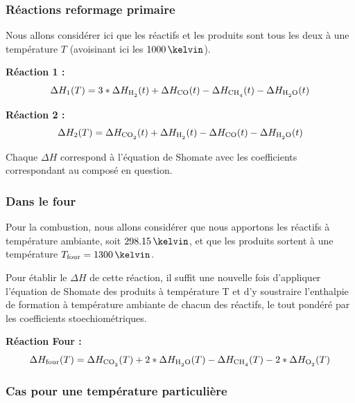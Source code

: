 \subsubsection{Réactions reformage primaire}

Nous allons considérer ici que les réactifs et les produits sont tous les deux
à une température $T$ (avoisinant ici les $1000\,\kelvin$).

\textbf{Réaction 1 :} 
\begin{equation*}
\Delta H_1 (T) = 3*\Delta H_{\ce{H2}} (t)
+ \Delta H_{\ce{CO}} (t)
- \Delta H_{\ce{CH4}} (t)
- \Delta H_{\ce{H2O}} (t)
\end{equation*}

\textbf{Réaction 2 :} 
\begin{equation*}
\Delta H_2 (T) = \Delta H_{\ce{CO2}} (t)
+ \Delta H_{\ce{H2}} (t)
- \Delta H_{\ce{CO}} (t)
- \Delta H_{\ce{H2O}} (t)
\end{equation*}

Chaque $\Delta H$ correspond à l’équation de Shomate
avec les coefficients correspondant au composé en question.

\subsubsection{Dans le four}

Pour la combustion, nous allons considérer que nous apportons les réactifs
à température ambiante, soit $298.15\,\kelvin$,
et que les produits sortent à une température $T\ind{four}=1300\,\kelvin$.

Pour établir le $\Delta H$ de cette réaction,
il suffit une nouvelle fois d’appliquer l’équation de Shomate des produits à température T
et d’y soustraire l’enthalpie de formation à température ambiante de chacun des réactifs,
le tout pondéré par les coefficients stoechiométriques.

\textbf{Réaction Four :} 
\begin{equation*}
\Delta H\ind{four}(T) = \Delta H_{\ce{CO2}} (T)
+ 2*\Delta H_{\ce{H2O}} (T)
- \Delta H\ind{\ce{CH4}}(T)
- 2*\Delta H\ind{\ce{O2}}(T)
\end{equation*}

\subsubsection{Cas pour une température particulière}

